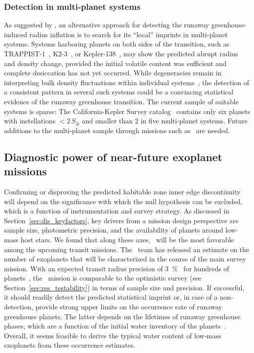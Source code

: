 \documentclass[twocolumn,twocolappendix]{aastex631}
\begin{document}
\subsubsection{Detection in multi-planet systems}
As suggested by \citet{Turbet2019}, an alternative approach for detecting the runaway greenhouse-induced radius inflation is to search for its ``local'' imprints in multi-planet systems.
Systems harboring planets on both sides of the transition, such as \mbox{TRAPPIST-1}~\citep{Gillon2016a,Gillon2017a,Luger2017c,Agol2021}, \mbox{K2-3}~\citep{2022AJ....164..172D}, or \mbox{Kepler-138}~\citep{2022NatAs.tmp..269P}, may show the predicted abrupt radius and density change, provided the initial volatile content was sufficient and complete desiccation has not yet occurred.
While degeneracies remain in interpreting bulk density fluctuations within individual systems~\citep[e.g.,][]{Turbet2020,Dorn2021}, the detection of a consistent pattern in several such systems could be a convincing statistical evidence of the runaway greenhouse transition.
The current sample of suitable systems is sparse: The California-Kepler Survey catalog~\citep{Fulton2018} contains only six planets with instellations $< 2\, S_\oplus$ and smaller than \SI{2}{\rEarth} in five multi-planet systems.
Future additions to the multi-planet sample through missions such as \plato\ are needed.

\subsection{Diagnostic power of near-future exoplanet missions}\label{sec:dis_samplesize}
Confirming or disproving the predicted habitable zone inner edge discontinuity will depend on the significance with which the null hypothesis can be excluded, which is a function of instrumentation and survey strategy.
As discussed in Section~\ref{sec:dis_keyfactors}, key drivers from a mission design perspective are sample size, photometric precision, and the availability of planets around low-mass host stars.
We found that along these axes, \plato\ will be the most favorable among the upcoming transit missions.
The \plato\ team has released an estimate on the number of exoplanets that will be characterized in the course of the main survey mission. %
With an expected transit radius precision of \SI{3}{\percent}~\citep{plato2017} for hundreds of planets~\citep{Rauer2021}, the \plato\ mission is comparable to the optimistic survey (see Section~\ref{sec:res_testability}) in terms of sample size and precision.
If successful, it should readily detect the predicted statistical imprint or, in case of a non-detection, provide strong upper limits on the occurrence rate of runaway greenhouse planets.
The latter depends on the lifetimes of runaway greenhouse phases, which are a function of the initial water inventory of the planets~\citep{Hamano2015}.
Overall, it seems feasible to derive the typical water content of low-mass exoplanets from these occurrence estimates.
\end{document}
